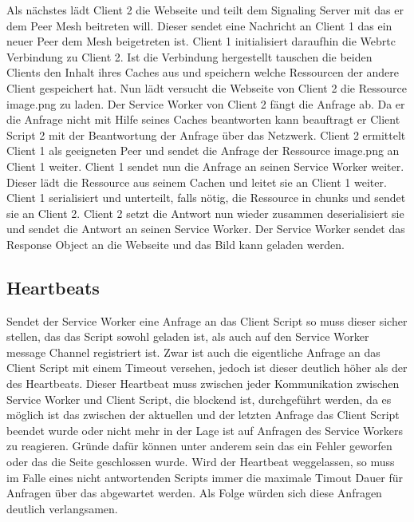 \begin{description}
Als nächstes lädt Client 2 die Webseite und teilt dem Signaling Server mit das er dem Peer Mesh beitreten will. Dieser sendet eine Nachricht an Client 1 das ein neuer Peer dem Mesh beigetreten ist. Client 1 initialisiert daraufhin die Webrtc Verbindung zu Client 2. Ist die Verbindung hergestellt tauschen die beiden Clients den Inhalt ihres Caches aus und speichern welche Ressourcen der andere Client gespeichert hat. Nun lädt versucht die Webseite von Client 2 die Ressource image.png zu laden. Der Service Worker von Client 2 fängt die Anfrage ab. Da er die Anfrage nicht mit Hilfe seines Caches beantworten kann beauftragt er Client Script 2 mit der Beantwortung der Anfrage über das \pTp Netzwerk. Client 2 ermittelt Client 1 als geeigneten Peer und sendet die Anfrage der Ressource image.png an Client 1 weiter. Client 1 sendet nun die Anfrage an seinen Service Worker weiter. Dieser lädt die Ressource aus seinem Cachen und leitet sie an Client 1 weiter. Client 1 serialisiert und unterteilt, falls nötig, die Ressource in chunks und sendet sie an Client 2. Client 2 setzt die Antwort nun wieder zusammen deserialisiert sie und sendet die Antwort an seinen Service Worker. Der Service Worker sendet das Response Object an die Webseite und das Bild kann geladen werden.

\subsection{Heartbeats}

Sendet der Service Worker eine Anfrage an das Client Script so muss dieser sicher stellen, das das Script sowohl geladen ist, als auch auf den Service Worker message Channel registriert ist. Zwar ist auch die eigentliche Anfrage an das Client Script mit einem Timeout versehen, jedoch ist dieser deutlich höher als der des Heartbeats. Dieser Heartbeat muss zwischen jeder Kommunikation zwischen Service Worker und Client Script, die blockend ist, durchgeführt werden, da es möglich ist das zwischen der aktuellen und der letzten Anfrage das Client Script beendet wurde oder nicht mehr in der Lage ist auf Anfragen des Service Workers zu reagieren. Gründe dafür können unter anderem sein das ein Fehler geworfen oder das die Seite geschlossen wurde. Wird der Heartbeat weggelassen, so muss im Falle eines nicht antwortenden Scripts immer die maximale Timout Dauer für Anfragen über das \pTp \cdn abgewartet werden. Als Folge würden sich diese Anfragen deutlich verlangsamen.


\end{description}
